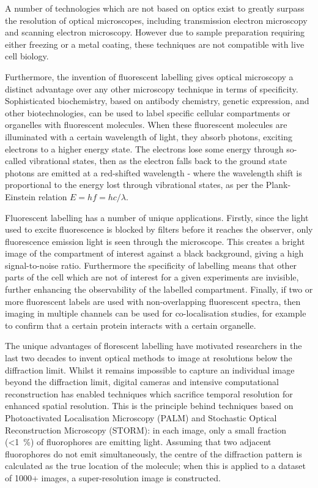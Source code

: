 A number of technologies which are not based on optics exist to greatly surpass the resolution of optical microscopes, including transmission electron microscopy and scanning electron microscopy.
However due to sample preparation requiring either freezing or a metal coating, these techniques are not compatible with live cell biology.

Furthermore, the invention of fluorescent labelling gives optical microscopy a distinct advantage over any other microscopy technique in terms of specificity. 
Sophisticated biochemistry, based on antibody chemistry, genetic expression, and other biotechnologies, can be used to label specific cellular compartments or organelles with fluorescent molecules. 
When these fluorescent molecules are illuminated with a certain wavelength of light, they absorb photons, exciting electrons to a higher energy state. 
The electrons lose some energy through so-called vibrational states, then as the electron falls back to the ground state photons are emitted at a red-shifted wavelength - where the wavelength shift is proportional to the energy lost through vibrational states, as per the Plank-Einstein relation $E=hf=hc/\lambda$. 

Fluorescent labelling has a number of unique applications. 
Firstly, since the light used to excite fluorescence is blocked by filters before it reaches the observer, only fluorescence emission light is seen through the microscope. 
This creates a bright image of the compartment of interest against a black background, giving a high signal-to-noise ratio.
Furthermore the specificity of labelling means that other parts of the cell which are not of interest for a given experiments are invisible, further enhancing the observability of the labelled compartment.
Finally, if two or more fluorescent labels are used with non-overlapping fluorescent spectra, then imaging in multiple channels can be used for co-localisation studies, for example to confirm that a certain protein interacts with a certain organelle. 

The unique advantages of florescent labelling have motivated researchers in the last two decades to invent optical methods to image at resolutions below the diffraction limit.
Whilst it remains impossible to capture an individual image beyond the diffraction limit, digital cameras and intensive computational reconstruction has enabled techniques which sacrifice temporal resolution for enhanced spatial resolution.
This is the principle behind techniques based on Photoactivated Localisation Microscopy (PALM) and Stochastic Optical Reconstruction Microscopy (STORM): in each image, only a small fraction (<\SI{1}{\percent}) of fluorophores are emitting light.
Assuming that two adjacent fluorophores do not emit simultaneously, the centre of the diffraction pattern is calculated as the true location of the molecule; when this is applied to a dataset of \num{1000}+ images, a super-resolution image is constructed. 

